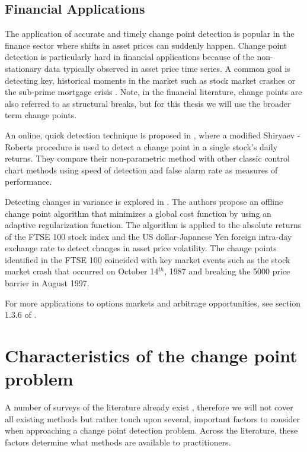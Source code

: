 \subsection{Financial Applications}
The application of accurate and timely change point detection is popular in the finance sector where shifts in asset prices can suddenly happen. Change point detection is particularly hard in financial applications because of the non-stationary data typically observed in asset price time series. A common goal is detecting key, historical moments in the market such as stock market crashes \cite{banerjee2019change}  or the sub-prime mortgage crisis \cite{zhu2015change}. Note, in the financial literature, change points  are also referred to as structural breaks, but for this thesis we will use the broader term change points.

An online, quick detection technique is proposed in  \cite{pepelyshev2015real}, where a modified Shiryaev - Roberts procedure is used to detect a change point in a single stock's daily returns. They compare their non-parametric method with other classic control chart methods using speed of detection and false alarm rate as measures of performance.

Detecting changes in variance is explored in  \cite{lavielle2007adaptive}. The authors propose an offline change point algorithm that minimizes a global cost function by using an adaptive regularization function. The algorithm is applied to the absolute returns of the FTSE 100 stock index and the US dollar-Japanese Yen foreign intra-day exchange rate to detect changes in asset price volatility. The change points  identified in the FTSE 100 coincided with key market events such as the stock market crash that occurred on October 14$^{th}$, 1987 and breaking the 5000 price barrier in August 1997.


For more applications to options markets and arbitrage opportunities, see section 1.3.6 of \cite{tartakovsky2014sequential}.


\section{Characteristics of the change point problem}
A number of surveys of the literature already exist \cite{aminikhanghahi2017survey} \cite{niu2016multiple}, therefore we will not cover all existing methods but rather touch upon several, important factors to consider when approaching a change point detection problem. Across the literature, these factors determine what methods are available to practitioners. %

